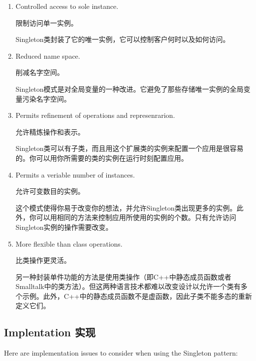 \begin{enumerate}

	\item Controlled access to sole instance.

	限制访问单一实例。
	
	Singleton类封装了它的唯一实例，它可以控制客户何时以及如何访问。

	\item Reduced name space.

	削减名字空间。

	Singleton模式是对全局变量的一种改进。它避免了那些存储唯一实例的全局变量污染名字空间。

	\item Permits refinement of operations and represenrarion.

	允许精炼操作和表示。

	Singleton类可以有子类，而且用这个扩展类的实例来配置一个应用是很容易的。你可以用你所需要的类的实例在运行时刻配置应用。

	\item Permits a veriable number of instances.

	允许可变数目的实例。

	这个模式使得你易于改变你的想法，并允许Singleton类出现更多的实例。此外，你可以用相同的方法来控制应用所使用的实例的个数。只有允许访问Singleton实例的操作需要改变。

	\item More flexible than class operations.

	比类操作更灵活。

	另一种封装单件功能的方法是使用类操作（即C++中静态成员函数或者Smalltalk中的类方法）。但这两种语言技术都难以改变设计以允许一个类有多个示例。此外，C++中的静态成员函数不是虚函数，因此子类不能多态的重新定义它们。

\end{enumerate}

\subsection{Implentation 实现}

Here are implementation issues to consider when using the Singleton pattern:

